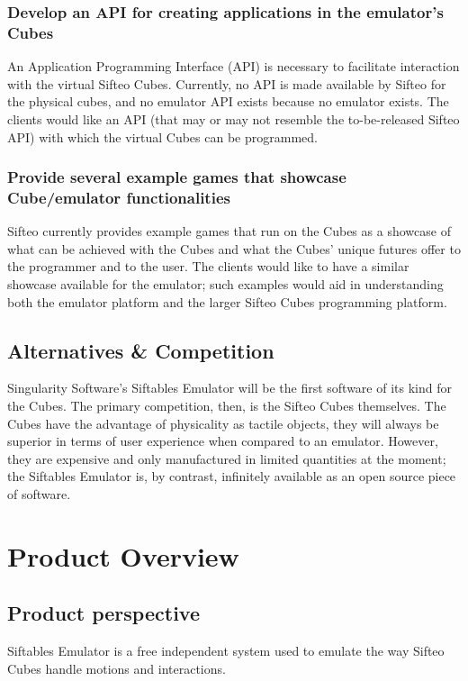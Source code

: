 \documentclass[12pt]{article}
\begin{document}
                          \subsubsection{Develop an API for creating applications in the emulator’s Cubes}
                          An Application Programming Interface (API) is necessary to facilitate interaction with the virtual Sifteo Cubes. Currently, no API is made available by Sifteo for the physical cubes, and no emulator API exists because no emulator exists. The clients would like an API (that may or may not resemble the to-be-released Sifteo API) with which the virtual Cubes can be programmed.

                          \subsubsection{Provide several example games that showcase Cube/emulator functionalities}
                          Sifteo currently provides example games that run on the Cubes as a showcase of what can be achieved with the Cubes and what the Cubes’ unique futures offer to the programmer and to the user. The clients would like to have a similar showcase available for the emulator; such examples would aid in understanding both the emulator platform and the larger Sifteo Cubes programming platform.

              \subsection{Alternatives \& Competition}
              Singularity Software’s Siftables Emulator will be the first software of its kind for the Cubes. The primary competition, then, is the Sifteo Cubes themselves. The Cubes have the advantage of physicality \- as tactile objects, they will always be superior in terms of user experience when compared to an emulator. However, they are expensive and only manufactured in limited quantities at the moment; the Siftables Emulator is, by contrast, infinitely available as an open source piece of software.

\section{Product Overview}

              \subsection{Product perspective}
              Siftables Emulator is a free independent system used to emulate the way Sifteo Cubes handle motions and interactions.
\end{document}
